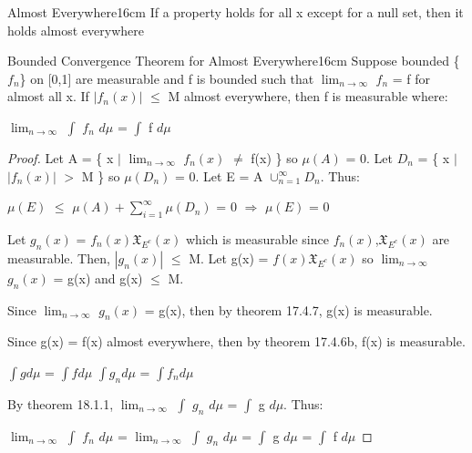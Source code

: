     \vspace{0.5cm}



    \begin{definition}{Almost Everywhere}{16cm}
        If a property holds for all x except for a null set,
        then it holds {\color{lblue} almost everywhere}
    \end{definition}

    \vspace{0.5cm}



    \begin{wtheorem}{Bounded Convergence Theorem for Almost Everywhere}{16cm}
        Suppose bounded \{$f_n$\} on [0,1] are measurable
        and f is bounded such that $\lim_{n \rightarrow \infty}$ $f_n$ = f
        for almost all x.
        If $|f_n(x)|$ $\leq$ M almost everywhere, then f is measurable where:

        \hspace{0.5cm}
        $\lim_{n \rightarrow \infty}$ $\int$ $f_n$ $d\mu$ = $\int$ f $d\mu$
    \end{wtheorem}

    \begin{proof}
        Let A = \{ x $|$ $\lim_{n \rightarrow \infty}$ $f_n(x)$ $\not =$ f(x) \}
        so $\mu(A)$ = 0.
        Let $D_n$ = \{ x $|$ $|f_n(x)|$ $>$ M \} so $\mu(D_n)$ = 0.
        Let E = A $\cup_{n=1}^{\infty} D_n$. Thus:

        \hspace{0.5cm}
        $\mu(E)$ $\leq$ $\mu(A) + \sum_{i=1}^{\infty} \mu(D_n)$ = 0
        \hspace{1cm}
        $\Rightarrow$
        \hspace{1cm}
        $\mu(E)$ = 0

        Let $g_n(x)$ = $f_n(x) \mathfrak{X}_{E^c}(x)$
        which is measurable since $f_n(x)$,$\mathfrak{X}_{E^c}(x)$
        are measurable. Then, $|g_n(x)|$ $\leq$ M.
        Let g(x) = $f(x) \mathfrak{X}_{E^c}(x)$
        so $\lim_{n \rightarrow \infty}$ $g_n(x)$ = g(x)
        and g(x) $\leq$ M.

        Since $\lim_{n \rightarrow \infty}$ $g_n(x)$ = g(x),
        then by {\color{red} theorem 17.4.7},  g(x) is measurable.

        Since g(x) = f(x) almost everywhere, then
        by {\color{red} theorem 17.4.6b}, f(x) is measurable.

        \hspace{0.5cm}
        $\int g d\mu$ = $\int f d\mu$
        \hspace{1cm}
        $\int g_n d\mu$ = $\int f_n d\mu$

        By {\color{red} theorem 18.1.1},
        $\lim_{n \rightarrow \infty}$ $\int$ $g_n$ $d\mu$ = $\int$ g $d\mu$.
        Thus:

        \hspace{0.5cm}
        $\lim_{n \rightarrow \infty}$ $\int$ $f_n$ $d\mu$
        = $\lim_{n \rightarrow \infty}$ $\int$ $g_n$ $d\mu$
        = $\int$ g $d\mu$
        = $\int$ f $d\mu$
    \end{proof}

